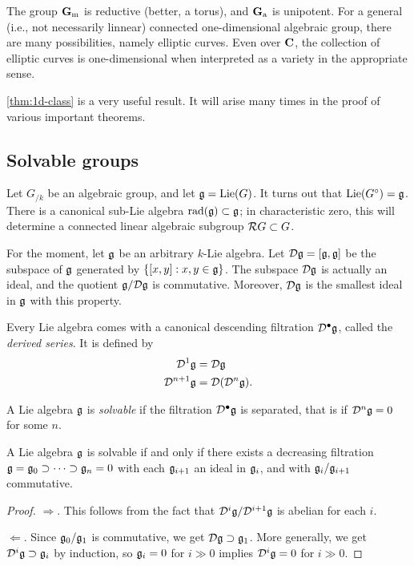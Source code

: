 The group $\mathbf{G}_\mathrm{m}$ is reductive (better, a torus), and $\mathbf{G}_\mathrm{a}$ is unipotent. For a 
general (i.e., not necessarily linnear) connected one-dimensional algebraic 
group, there are many possibilities, namely elliptic curves. Even over $\mathbf{C}$, 
the collection of elliptic curves is one-dimensional when interpreted as a 
variety in the appropriate sense. 

\autoref{thm:1d-class} is a very useful result. It will arise many times in 
the proof of various important theorems. 





\subsection{Solvable groups}

Let $G_{/k}$ be an algebraic group, and let $\mathfrak{g}=\operatorname{Lie}(G)$. It turns out that 
$\operatorname{Lie}(G^\circ)=\mathfrak{g}$. There is a canonical sub-Lie algebra 
$\operatorname{rad}(\mathfrak{g})\subset \mathfrak{g}$; in characteristic zero, this will determine a 
connected linear algebraic subgroup $\mathcal{R} G\subset G$. 

For the moment, let $\mathfrak{g}$ be an arbitrary $k$-Lie algebra. 
Let $\mathcal{D}\mathfrak{g}=[\mathfrak{g},\mathfrak{g}]$ be the subspace 
of $\mathfrak{g}$ generated by $\{[x,y]:x,y\in \mathfrak{g}\}$.
The subspace $\mathcal{D}\mathfrak{g}$ is actually an ideal, and the quotient 
$\mathfrak{g}/\mathcal{D}\mathfrak{g}$ is commutative. Moreover, $\mathcal{D}\mathfrak{g}$ is the smallest 
ideal in $\mathfrak{g}$ with this property. 

Every Lie algebra comes with a canonical descending filtration 
$\mathcal{D}^\bullet\mathfrak{g}$, called the \emph{derived series}. It is defined by 
\begin{align*}
  \mathcal{D}^1\mathfrak{g} &= \mathcal{D} \mathfrak{g} \\
  \mathcal{D}^{n+1}\mathfrak{g} &=\mathcal{D}(\mathcal{D}^n\mathfrak{g}) .
\end{align*}

\begin{definition}
A Lie algebra $\mathfrak{g}$ is \emph{solvable} if the filtration $\mathcal{D}^\bullet\mathfrak{g}$ 
is separated, that is if $\mathcal{D}^n\mathfrak{g}=0$ for some $n$. 
\end{definition}

\begin{lemma}
A Lie algebra $\mathfrak{g}$ is solvable if and only if there exists a decreasing 
filtration $\mathfrak{g}=\mathfrak{g}_0\supset \cdots \supset \mathfrak{g}_n=0$ with each $\mathfrak{g}_{i+1}$ an 
ideal in $\mathfrak{g}_i$, and with $\mathfrak{g}_i/\mathfrak{g}_{i+1}$ commutative. 
\end{lemma}
\begin{proof}
$\Rightarrow$. This follows from the fact that 
$\mathcal{D}^i\mathfrak{g} / \mathcal{D}^{i+1}\mathfrak{g}$ is abelian for each $i$. 

$\Leftarrow$. Since $\mathfrak{g}_0/\mathfrak{g}_1$ is commutative, we get 
$\mathcal{D}\mathfrak{g}\supset\mathfrak{g}_1$. More generally, we get $\mathcal{D}^i\mathfrak{g}\supset \mathfrak{g}_i$ 
by induction, so $\mathfrak{g}_i=0$ for $i\gg 0$ implies $\mathcal{D}^i\mathfrak{g}=0$ for $i\gg 0$. 
\end{proof}

